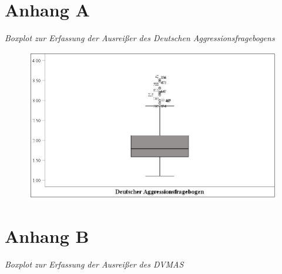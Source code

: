 \begin{appendices}
    \chapter*{Anhang A}     \label{Boxplot_AggroFB}
    \noindent \textit{Boxplot zur Erfassung der Ausreißer des Deutschen Aggressionsfragebogens}

    \begin{figure}[htb!]
        \centering
            \includegraphics[width=\textwidth]{Boxplot AggroFB.jpg}

    \end{figure}

    
    


    \chapter*{Anhang B}            \label{Boxplot_DVMAS}
    \noindent \textit{Boxplot zur Erfassung der Ausreißer des DVMAS}


\end{appendices}
